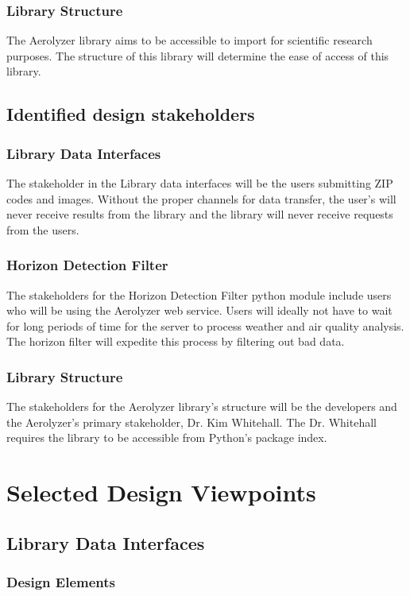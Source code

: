 \documentclass[onecolumn, draftclsnofoot,10pt, compsoc]{IEEEtran}
\begin{document}
\begin{singlespace}
        \subsubsection{Library Structure}
        The Aerolyzer library aims to be accessible to import for scientific research purposes. The structure of this library will determine the ease of access of this library.
	\subsection{Identified design stakeholders}
    	\subsubsection{Library Data Interfaces}
        The stakeholder in the Library data interfaces will be the users submitting ZIP codes and images. Without the proper channels for data transfer, the user’s will never receive results from the library and the library will never receive requests from the users.
        \subsubsection{Horizon Detection Filter}
        The stakeholders for the Horizon Detection Filter python module include users who will be using the Aerolyzer web service. Users will ideally not have to wait for long periods of time for the server to process weather and air quality analysis. The horizon filter will expedite this process by filtering out bad data.
        \subsubsection{Library Structure}
        The stakeholders for the Aerolyzer library’s structure will be the developers and the Aerolyzer’s primary stakeholder, Dr. Kim Whitehall. The Dr. Whitehall requires the library to be accessible from Python’s package index.
\section{Selected Design Viewpoints}
	\subsection{Library Data Interfaces}
      \subsubsection{Design Elements}

\end{singlespace}
\end{document}
